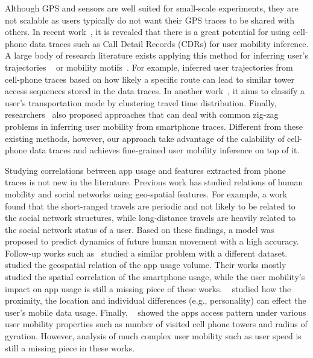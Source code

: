 Although GPS and sensors are well suited for small-scale experiments, they are not scalable as users typically do not want their GPS traces to be shared with others. In recent work~\cite{rose2006mobile},  it is revealed that there is a great potential for using cell-phone data traces such as Call Detail Records (CDRs) for user mobility inference. A large body of research literature exists applying this method for inferring user's trajectories ~\cite{smoreda2013spatiotemporal, hoteit2014estimating, widhalm2015discovering, Alsolami2012Auth, jiang2013review, bekhor2015investigation, leontiadis2014cells} or mobility motifs~\cite{wang2014mobile, gambs2012next}. For example, \cite{Alsolami2012Auth, jiang2013review} inferred user trajectories from cell-phone traces based on how likely a specific route can lead to similar tower access sequences stored in the data traces. In another work~\cite{wang2010transportation}, it aims to classify a user's transportation mode by clustering travel time distribution. Finally, researchers~\cite{bekhor2015investigation} also proposed approaches that can deal with common zig-zag problems in inferring user mobility from smartphone traces.
Different from these existing methods, however, our approach take advantage of the calability of cell-phone data traces and achieves fine-grained user mobility inference on top of it.


Studying correlations between app usage and features extracted from phone traces is not new in the literature. Previous work has studied relations of human mobility and social networks using geo-spatial features. For example, a work \cite{cho2011friendship} found that the short-ranged travels are periodic and not likely to be related to the social network structures, while long-distance travels are heavily related to the social network status of a user. Based on these findings, a model was proposed to predict dynamics of future human movement with a high accuracy. Follow-up works such as~\cite{Noulas11} studied a similar problem with a different dataset. ~\cite{shafiq2012characterizing,yang2015characterizing} studied the geospatial relation of the app usage volume. Their works mostly studied the spatial correlation of the smartphone usage, while the user mobility's impact on app usage is still a missing piece of these works. ~\cite{meng2014analyzing} studied how the proximity, the location and individual differences (e.g., personality) can effect the user's mobile data usage. Finally, ~\cite{yang2016apps} showed the apps access pattern under various user mobility properties such as number of visited cell phone towers and radius of gyration. However, analysis of much complex user mobility such as user speed is still a missing piece in these works. 


